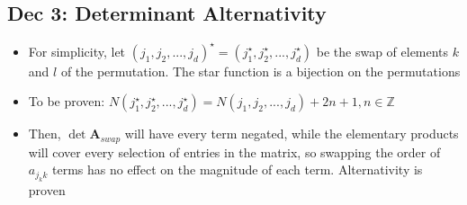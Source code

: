 \documentclass[10pt, oneside]{article}
\newcommand{\Z}{\mathbb{Z}}
\newcommand{\mat}[1]{\mathbf{#1}}
\begin{document}
\subsection{Dec 3: Determinant Alternativity}
\begin{itemize}
    \item  For simplicity, let $(j_1,j_2,...,j_d)^\star = (j_1^\star,j_2^\star,...,j_d^\star)$ be the swap of elements $k$ and $l$ of the permutation. The star function is a bijection on the permutations
    \item To be proven: $N(j_1^\star,j_2^\star,...,j_d^\star) = N(j_1,j_2,...,j_d) + 2n + 1, n \in \Z$
    \item Then, $\det \mat{A}_{swap}$ will have every term negated, while the elementary products will cover every selection of entries in the matrix, so swapping the order of $a_{j_k k}$ terms has no effect on the magnitude of each term. Alternativity is proven
\end{itemize}
\end{document}
